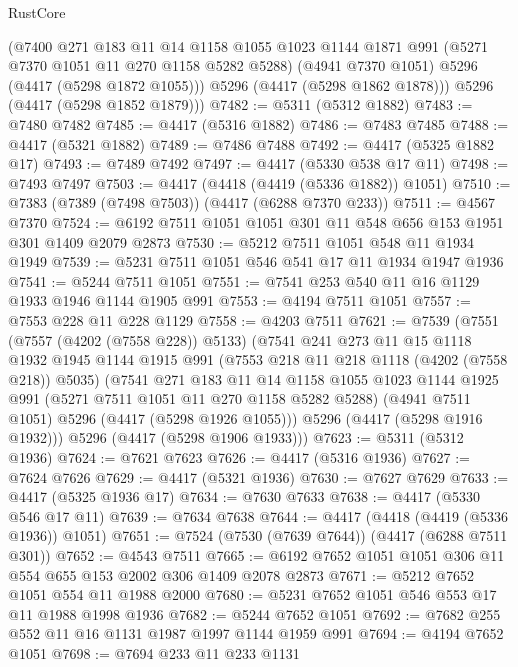 \begin{lexlean}{RustCore}
\begin{coremodule}
        (@7400
          @271
          @183
          @11
          @14
          @1158
          @1055
          @1023
          @1144
          @1871
          @991
          (@5271 @7370 @1051 @11 @270 @1158 @5282 @5288)
          (@4941 @7370 @1051)
          @5296
          (@4417 (@5298 @1872 @1055)))
        @5296
        (@4417 (@5298 @1862 @1878)))
      @5296
      (@4417 (@5298 @1852 @1879)))
@7482 := @5311 (@5312 @1882)
@7483 := @7480 @7482
@7485 := @4417 (@5316 @1882)
@7486 := @7483 @7485
@7488 := @4417 (@5321 @1882)
@7489 := @7486 @7488
@7492 := @4417 (@5325 @1882 @17)
@7493 := @7489 @7492
@7497 := @4417 (@5330 @538 @17 @11)
@7498 := @7493 @7497
@7503 := @4417 (@4418 (@4419 (@5336 @1882)) @1051)
@7510 := @7383 (@7389 (@7498 @7503)) (@4417 (@6288 @7370 @233))
@7511 := @4567 @7370
@7524 := @6192 @7511 @1051 @1051 @301 @11 @548 @656 @153 @1951 @301 @1409 @2079 @2873
@7530 := @5212 @7511 @1051 @548 @11 @1934 @1949
@7539 := @5231 @7511 @1051 @546 @541 @17 @11 @1934 @1947 @1936
@7541 := @5244 @7511 @1051
@7551 := @7541 @253 @540 @11 @16 @1129 @1933 @1946 @1144 @1905 @991
@7553 := @4194 @7511 @1051
@7557 := @7553 @228 @11 @228 @1129
@7558 := @4203 @7511
@7621 := @7539
    (@7551
      (@7557 (@4202 (@7558 @228)) @5133)
      (@7541
        @241
        @273
        @11
        @15
        @1118
        @1932
        @1945
        @1144
        @1915
        @991
        (@7553 @218 @11 @218 @1118 (@4202 (@7558 @218)) @5035)
        (@7541
          @271
          @183
          @11
          @14
          @1158
          @1055
          @1023
          @1144
          @1925
          @991
          (@5271 @7511 @1051 @11 @270 @1158 @5282 @5288)
          (@4941 @7511 @1051)
          @5296
          (@4417 (@5298 @1926 @1055)))
        @5296
        (@4417 (@5298 @1916 @1932)))
      @5296
      (@4417 (@5298 @1906 @1933)))
@7623 := @5311 (@5312 @1936)
@7624 := @7621 @7623
@7626 := @4417 (@5316 @1936)
@7627 := @7624 @7626
@7629 := @4417 (@5321 @1936)
@7630 := @7627 @7629
@7633 := @4417 (@5325 @1936 @17)
@7634 := @7630 @7633
@7638 := @4417 (@5330 @546 @17 @11)
@7639 := @7634 @7638
@7644 := @4417 (@4418 (@4419 (@5336 @1936)) @1051)
@7651 := @7524 (@7530 (@7639 @7644)) (@4417 (@6288 @7511 @301))
@7652 := @4543 @7511
@7665 := @6192 @7652 @1051 @1051 @306 @11 @554 @655 @153 @2002 @306 @1409 @2078 @2873
@7671 := @5212 @7652 @1051 @554 @11 @1988 @2000
@7680 := @5231 @7652 @1051 @546 @553 @17 @11 @1988 @1998 @1936
@7682 := @5244 @7652 @1051
@7692 := @7682 @255 @552 @11 @16 @1131 @1987 @1997 @1144 @1959 @991
@7694 := @4194 @7652 @1051
@7698 := @7694 @233 @11 @233 @1131

\end{coremodule}
\end{lexlean}
